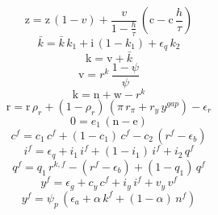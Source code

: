 \begin{dmath}
{{\mathrm{z}}}={{\mathrm{z}}}\, \left(1-{{v}}\right)+\frac{{{v}}}{1-\frac{{{h}}}{{{\tau}}}}\, \left({{\mathrm{c}}}-{{\mathrm{c}}}\, \frac{{{h}}}{{{\tau}}}\right)
\end{dmath}
\begin{dmath}
{{\bar{k}}}={{\bar{k}}}\, {{k_{1}}}+{{\mathrm{i}}}\, \left(1-{{k_{1}}}\right)+{{\epsilon_{q}}}\, {{k_{2}}}
\end{dmath}
\begin{dmath}
{{\mathrm{k}}}={{\mathrm{v}}}+{{\bar{k}}}
\end{dmath}
\begin{dmath}
{{\mathrm{v}}}={{r^{k}}}\, \frac{1-{{\psi}}}{{{\psi}}}
\end{dmath}
\begin{dmath}
{{\mathrm{k}}}={{\mathrm{n}}}+{{\mathrm{w}}}-{{r^{k}}}
\end{dmath}
\begin{dmath}
{{\mathrm{r}}}={{\mathrm{r}}}\, {{\rho_{r}}}+\left(1-{{\rho_{r}}}\right)\, \left({{\pi}}\, {{r_{\pi}}}+{{r_{y}}}\, {{y^{gap}}}\right)-{{\epsilon_{r}}}
\end{dmath}
\begin{dmath}
0={{e_{1}}}\, \left({{\mathrm{n}}}-{{\mathrm{e}}}\right)
\end{dmath}
\begin{dmath}
{{c^{f}}}={{c_{1}}}\, {{c^{f}}}+\left(1-{{c_{1}}}\right)\, {{c^{f}}}-{{c_{2}}}\, \left({{r^{f}}}-{{\epsilon_{b}}}\right)
\end{dmath}
\begin{dmath}
{{i^{f}}}={{\epsilon_{q}}}+{{i_{1}}}\, {{i^{f}}}+\left(1-{{i_{1}}}\right)\, {{i^{f}}}+{{i_{2}}}\, {{q^{f}}}
\end{dmath}
\begin{dmath}
{{q^{f}}}={{q_{1}}}\, {{r^{k,f}}}-\left({{r^{f}}}-{{\epsilon_{b}}}\right)+\left(1-{{q_{1}}}\right)\, {{q^{f}}}
\end{dmath}
\begin{dmath}
{{y^{f}}}={{\epsilon_{g}}}+{{c_{y}}}\, {{c^{f}}}+{{i_{y}}}\, {{i^{f}}}+{{v_{y}}}\, {{v^{f}}}
\end{dmath}
\begin{dmath}
{{y^{f}}}={{\psi_{p}}}\, \left({{\epsilon_{a}}}+{{\alpha}}\, {{k^{f}}}+\left(1-{{\alpha}}\right)\, {{n^{f}}}\right)
\end{dmath}
